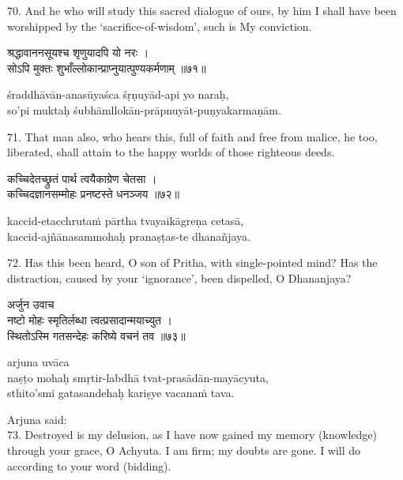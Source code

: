 70. And he who will study this sacred dialogue of ours, by him I shall have
been worshipped by the `sacrifice-of-wisdom', such is My conviction.

\begin{gitaverse}
श्रद्धावाननसूयश्च शृणुयादपि यो नरः । \\
सोऽपि मुक्तः शुभाँल्लोकान्प्राप्नुयात्पुण्यकर्मणाम् ॥७१॥
\end{gitaverse}

\begin{transliteration}
śraddhāvān-anasūyaśca śṛṇuyād-api yo naraḥ, \\
so'pi muktaḥ śubhāmllokān-prāpnuyāt-puṇyakarmaṇām.
\end{transliteration}

71. That man also, who hears this, full of faith and free from malice, he too,
liberated, shall attain to the happy worlds of those righteous deeds.

\begin{gitaverse}
कच्चिदेतच्छ्रुतं पार्थ त्वयैकाग्रेण चेतसा । \\
कच्चिदज्ञानसम्मोहः प्रनष्टस्ते धनञ्जय ॥७२॥
\end{gitaverse}

\begin{transliteration}
kaccid-etacchrutaṁ pārtha tvayaikāgreṇa cetasā, \\
kaccid-ajñānasammohaḥ pranaṣṭas-te dhanañjaya.
\end{transliteration}

72. Has this been heard, O son of Pritha, with single-pointed mind? Has the
distraction, caused by your `ignorance', been dispelled, O Dhananjaya?

\begin{gitaverse}
अर्जुन उवाच \\
नष्टो मोहः स्मृतिर्लब्धा त्वत्प्रसादान्मयाच्युत । \\
स्थितोऽस्मि गतसन्देहः करिष्ये वचनं तव ॥७३॥
\end{gitaverse}

\begin{transliteration}
arjuna uvāca \\
naṣṭo mohaḥ smṛtir-labdhā tvat-prasādān-mayācyuta, \\
sthito'smi gatasandehaḥ kariṣye vacanaṁ tava.
\end{transliteration}

Arjuna said: \\
73. Destroyed is my delusion, as I have now gained my memory (knowledge)
through your grace, O Achyuta. I am firm; my doubts are gone. I will do
according to your word (bidding).

